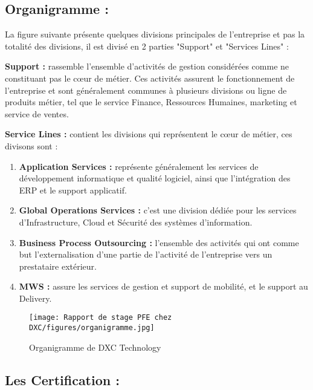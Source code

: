 \newpage
\subsection{Organigramme :}
La figure suivante présente quelques divisions principales de l’entreprise et pas la totalité
des divisions, il est divisé en 2 parties "Support" et "Services Lines" :

\begin{description}
  \item \textbf{Support :} rassemble l’ensemble d'activités de gestion considérées comme ne constituant pas le cœur de métier. Ces activités assurent le fonctionnement de l'entreprise et sont généralement communes à plusieurs divisions ou ligne de produits métier, tel que le service Finance, Ressources Humaines, marketing et service de ventes.
  \item \textbf{Service Lines :} contient les divisions qui représentent le cœur de métier, ces divisons
 sont :
 \begin{enumerate}
   \item \textbf{Application Services :} représente généralement les services de développement informatique et qualité logiciel, ainsi que l’intégration des ERP et le support applicatif.
   \item \textbf{Global Operations Services :} c’est une division dédiée pour les services d’Infrastructure, Cloud et Sécurité des systèmes d’information.
   \item \textbf{Business Process Outsourcing : } l’ensemble des activités qui ont comme but l'externalisation d'une partie de l'activité de l'entreprise vers un prestataire extérieur.
    \item \textbf{MWS  : } assure les services de gestion et support de mobilité, et le support au Delivery.
 \end{enumerate}
  
  \begin{figure}[!h]
    \centering
    \texttt{[image: Rapport de stage PFE chez DXC/figures/organigramme.jpg]}
    \caption{Organigramme de DXC Technology}
\end{figure}
  
\end{description}

\subsection{Les Certification :}

